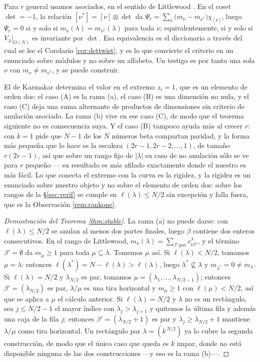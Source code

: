 \documentclass[11pt,reqno]{amsart}
\theoremstyle{plain}
\theoremstyle{definition}
\begin{document}
Para $r$ general usamos asociados, en el sentido de Littlewood \cite{Lit50}.
En el coset $\det=-1$, la relación $[\nu^{*}]=[\nu]\otimes\det$ da
$\Psi_r=\sum_\nu\big(m_\nu-m_{\nu^{*}}\big)\chi_{[\nu]}$, luego $\Psi_r=0$ si y solo si
$m_\nu(\lambda)=m_{\nu^{*}}(\lambda)$ para toda $\nu$; equivalentemente, si y solo si
$V_\lambda|_{O(N)}$ es invariante por $\det$. Esa equivalencia es el diccionario a través del cual se
lee el Corolario \ref{cor:dettwist}, y es lo que convierte el criterio en un enunciado sobre módulos
y no sobre un alfabeto. Un testigo es por tanto una sola $\nu$ con
$m_\nu\ne m_{\nu^{*}}$, y se puede construir.

El \cite[Teorema 4.1]{Kar24} de Karmakar determina el valor en el extremo $z_i=1$, que es un elemento
de orden dos: el caso (A) es la rama (a), el caso (B) es una dimensión no nula, y el caso (C) deja una
suma alternante de productos de dimensiones sin criterio de anulación asociado. La rama (b) vive en
ese caso (C), de modo que el teorema siguiente no es consecuencia suya. Y el caso (B) tampoco ayuda
más al crecer $r$: con $k=1$ pide que $N-1$ de los $N$ números beta compartan paridad, y la forma más
pequeña que lo hace es la escalera $(2r-1,2r-2,\dots,1)$, de tamaño $r(2r-1)$, así que sobre un rango
fijo de $|\lambda|$ su caso de no anulación sólo se ve para $r$ pequeño --- su resultado es más
afilado exactamente donde el nuestro es más fácil. Lo que conecta el extremo con
la curva es la rigidez, y la rigidez es un enunciado sobre nuestro objeto y no sobre el elemento de
orden dos: sobre los rangos de la \S\ref{sec:verif} se cumple en $\ell(\lambda)\le N/2$ sin excepción
y falla fuera, que es la Observación \ref{rem:rankone}.

\begin{proof}[Demostración del Teorema \ref{thm:stable}]
La rama (a) no puede darse: con $\ell(\lambda)\le N/2$ se anulan al menos dos partes finales, luego
$\beta$ contiene dos enteros consecutivos. En el rango de Littlewood,
$m_\nu(\lambda)=\sum_{\beta'\ \mathrm{par}}c^{\lambda}_{\nu\beta'}$, y el término
$\beta'=\emptyset$ da $m_\mu\ge1$ para toda $\mu\subseteq\lambda$. Tomemos $\mu$ así. Si
$\ell(\lambda)<N/2$, tomamos $\mu=\lambda$: entonces
$\ell(\lambda^{*})=N-\ell(\lambda)>\ell(\lambda)$, luego $\lambda^{*}\not\subseteq\lambda$ y
$m_{\lambda^{*}}=0\ne m_\lambda$. Si $\ell(\lambda)=N/2$ y $\lambda_{N/2}$ es par, tomamos
$\mu=(\lambda_1,\dots,\lambda_{N/2-1})$; entonces $\beta'=(\lambda_{N/2})$ es par, $\lambda/\mu$ es
una tira horizontal y $m_\mu\ge1$ con $\ell(\mu)<N/2$, así que se aplica a $\mu$ el cálculo anterior.
Si $\ell(\lambda)=N/2$ y $\lambda$ no es un rectángulo, sea $j\le N/2-1$ el mayor índice con
$\lambda_j>\lambda_{j+1}$ y quitemos la última fila y además una caja de la fila $j$; entonces
$\beta'=(\lambda_{N/2}+1)$ es par y $\lambda_j\ge\lambda_{N/2}+1$ mantiene $\lambda/\mu$ como tira
horizontal. Un rectángulo par $\lambda=(k^{\,N/2})$ ya lo cubre la segunda construcción, de modo que
el único caso que queda es $k$ impar, donde no está disponible ninguna de las dos construcciones
---y eso es la rama {\rm(b)}---.
\end{proof}
\end{document}
